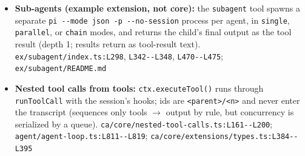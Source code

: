 \begin{itemize}
\item \textbf{Sub-agents (example extension, not core):} the \texttt{subagent} tool spawns a separate \texttt{pi -\allowbreak{}-\allowbreak{}mode json -\allowbreak{}p -\allowbreak{}-\allowbreak{}no-\allowbreak{}session} process per agent, in \texttt{single}, \texttt{parallel}, or \texttt{chain} modes, and returns the child's final output as the tool result (depth 1; results return as tool-result text). \texttt{ex/\allowbreak{}subagent/\allowbreak{}index.\allowbreak{}ts:\allowbreak{}L298}, \texttt{L342-\allowbreak{}-\allowbreak{}L348}, \texttt{L470-\allowbreak{}-\allowbreak{}L475}; \texttt{ex/\allowbreak{}subagent/\allowbreak{}README.\allowbreak{}md}
\item \textbf{Nested tool calls from tools:} \texttt{ctx.\allowbreak{}executeTool(\allowbreak{})} runs through \texttt{runToolCall} with the session's hooks; ids are \texttt{<parent>/\allowbreak{}<n>} and never enter the transcript (sequences only tools $\rightarrow$ output by rule, but concurrency is serialized by a queue). \texttt{ca/\allowbreak{}core/\allowbreak{}nested-\allowbreak{}tool-\allowbreak{}calls.\allowbreak{}ts:\allowbreak{}L161-\allowbreak{}-\allowbreak{}L200}; \texttt{agent/\allowbreak{}agent-\allowbreak{}loop.\allowbreak{}ts:\allowbreak{}L811-\allowbreak{}-\allowbreak{}L819}; \texttt{ca/\allowbreak{}core/\allowbreak{}extensions/\allowbreak{}types.\allowbreak{}ts:\allowbreak{}L384-\allowbreak{}-\allowbreak{}L395}
\end{itemize}

